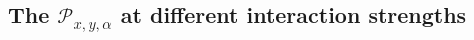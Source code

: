 \documentclass[longbibliography, aps, prx, amsmath, amssymb, amsfonts, twocolumn,superscriptaddress, footinbib]{revtex4-1}
\begin{document}

    

	\subsection{The $\mathcal{P}_{x,y,\alpha}$ at different interaction strengths~\label{sec:AllP}}
\end{document}
